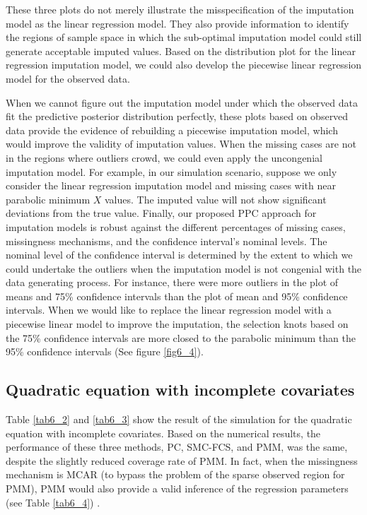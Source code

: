 	These three plots do not merely illustrate the misspecification of the imputation model as the linear regression model. They also provide information to identify the regions of sample space in which the sub-optimal imputation model could still generate acceptable imputed values. Based on the distribution plot for the linear regression imputation model, we could also develop the piecewise linear regression model for the observed data. 
	
	When we cannot figure out the imputation model under which the observed data fit the predictive posterior distribution perfectly, these plots based on observed data provide the evidence of rebuilding a piecewise imputation model, which would improve the validity of imputation values. When the missing cases are not in the regions where outliers crowd, we could even apply the uncongenial imputation model. For example, in our simulation scenario, suppose we only consider the linear regression imputation model and missing cases with near parabolic minimum $X$ values. The imputed value will not show significant deviations from the true value. Finally, our proposed PPC approach for imputation models is robust against the different percentages of missing cases, missingness mechanisms, and the confidence interval's nominal levels. The nominal level of the confidence interval is determined by the extent to which we could undertake the outliers when the imputation model is not congenial with the data generating process. For instance, there were more outliers in the plot of means and 75\% confidence intervals than the plot of mean and 95\% confidence intervals. When we would like to replace the linear regression model with a piecewise linear model to improve the imputation, the selection knots based on the 75\% confidence intervals are more closed to the parabolic minimum than the 95\% confidence intervals (See figure \ref{fig6_4}). 
	
	\subsection{Quadratic equation with incomplete covariates}	
	Table \ref{tab6_2} and \ref{tab6_3} show the result of the simulation for the quadratic equation with incomplete covariates. Based on the numerical results, the performance of these three methods, PC, SMC-FCS, and PMM, was the same, despite the slightly reduced coverage rate of PMM. In fact, when the missingness mechanism is MCAR (to bypass the problem of the sparse observed region for PMM), PMM would also provide a valid inference of the regression parameters (see Table \ref{tab6_4}) \citep{Vink2013}.
	
